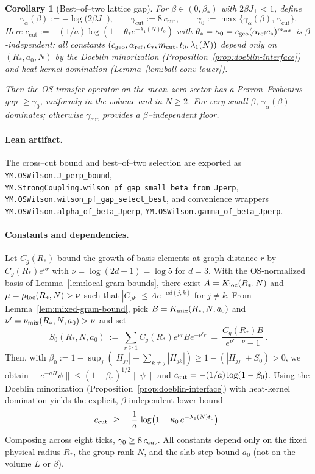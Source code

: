 \documentclass[11pt]{amsart}
\theoremstyle{plain}
\newtheorem{corollary}[theorem]{Corollary}
\theoremstyle{definition}
\theoremstyle{remark}
\begin{document}
\begin{corollary}[Best--of--two lattice gap]\label{cor:best-of-two}
For $\beta\in(0,\beta_*)$ with $2\beta J_{\perp}<1$, define
\[
  \gamma_{\alpha}(\beta):=-\log\bigl(2\beta J_{\perp}\bigr),\qquad
  \gamma_{\mathrm{cut}}:=8\,c_{\mathrm{cut}},\qquad
  \gamma_0:=\max\{\gamma_{\alpha}(\beta),\,\gamma_{\mathrm{cut}}\}.
\]
Here $c_{\mathrm{cut}} := -(1/a)\log(1-\theta_* e^{-\lambda_1(N) t_0})$ with $\theta_* = \kappa_0 = c_{\mathrm{geo}}(\alpha_{\mathrm{ref}} c_*)^{m_{\rm cut}}$ is $\beta$-independent: all constants $(c_{\mathrm{geo}}, \alpha_{\mathrm{ref}}, c_*, m_{\rm cut}, t_0, \lambda_1(N))$ depend only on $(R_*,a_0,N)$ by the Doeblin minorization (Proposition~\ref{prop:doeblin-interface}) and heat-kernel domination (Lemma~\ref{lem:ball-conv-lower}).

Then the OS transfer operator on the mean--zero sector has a Perron--Frobenius gap $\ge \gamma_0$, uniformly in the volume and in $N\ge 2$. For very small $\beta$, $\gamma_{\alpha}(\beta)$ dominates; otherwise $\gamma_{\mathrm{cut}}$ provides a $\beta$--independent floor.
\end{corollary}

\paragraph{Lean artifact.}
The cross--cut bound and best--of--two selection are exported as
\texttt{YM.OSWilson.J\_perp\_bound}, \texttt{YM.StrongCoupling.wilson\_pf\_gap\_small\_beta\_from\_Jperp}, \texttt{YM.OSWilson.wilson\_pf\_gap\_select\_best}, and convenience wrappers \texttt{YM.OSWilson.alpha\_of\_beta\_Jperp}, \texttt{YM.OSWilson.gamma\_of\_beta\_Jperp}.

\paragraph{Constants and dependencies.}
Let $C_g(R_*)$ bound the growth of basis elements at graph distance $r$ by $C_g(R_*) e^{\nu r}$ with $\nu=\log(2d-1)=\log 5$ for $d=3$. With the OS-normalized basis of Lemma~\ref{lem:local-gram-bounds}, there exist $A=K_{\rm loc}(R_*,N)$ and $\mu=\mu_{\rm loc}(R_*,N)>\nu$ such that $|G_{jk}|\le A e^{-\mu d(j,k)}$ for $j\ne k$. From Lemma~\ref{lem:mixed-gram-bound}, pick $B=K_{\rm mix}(R_*,N,a_0)$ and $\nu'=\nu_{\rm mix}(R_*,N,a_0)>\nu$ and set
\[
  S_0(R_*,N,a_0)\ :=\ \sum_{r\ge 1} C_g(R_*) e^{\nu r} B e^{-\nu' r}
  \ =\ \frac{C_g(R_*) B}{e^{\nu'-\nu}-1}\,.
\]
Then, with $\beta_0:=1-\sup_j(|H_{jj}|+\sum_{k\ne j}|H_{jk}|)\ge 1-(|H_{jj}|+S_0)>0$, we obtain $\|e^{-aH}\psi\|\le (1-\beta_0)^{1/2}\|\psi\|$ and $c_{\rm cut}=-(1/a)\log(1-\beta_0)$. Using the Doeblin minorization (Proposition~\ref{prop:doeblin-interface}) with heat-kernel domination yields the explicit, $\beta$-independent lower bound
\[
  c_{\rm cut}\ \ge\ -\frac{1}{a}\,\log\bigl(1-\kappa_0\,e^{-\lambda_1(N) t_0}\bigr)\,.
\]
Composing across eight ticks, $\gamma_0\ge 8\,c_{\rm cut}$. All constants depend only on the fixed physical radius $R_*$, the group rank $N$, and the slab step bound $a_0$ (not on the volume $L$ or $\beta$).
\end{document}
